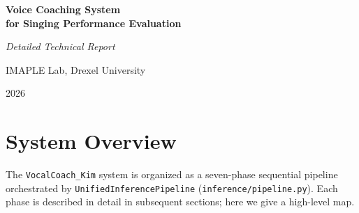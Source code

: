 \documentclass[11pt,letterpaper]{article}
\begin{document}
\begin{titlepage}
  \centering
  \vspace*{2cm}
  {\LARGE\bfseries Voice Coaching System\\[6pt]
   for Singing Performance Evaluation\par}
  \vspace{0.5cm}
  {\large\itshape Detailed Technical Report\par}
  \vspace{1.5cm}
  {\large IMAPLE Lab, Drexel University\par}
  \vspace{0.5cm}
  {\large 2026\par}
  \vspace{2cm}
  \begin{abstract}
    \noindent
    This report provides a comprehensive technical description of the
    \texttt{VocalCoach\_Kim} software system — a reference-guided pipeline for
    objective singing performance evaluation.
    The system accepts a raw audio recording and a musical reference (MusicXML
    score and Praat TextGrid annotation) and produces a structured coaching
    report covering pitch accuracy, timing, note duration, and lyric
    intelligibility.
    Three deep neural networks act as \emph{feature extractors}: a
    torchcrepe/CREPE CNN for fundamental frequency estimation, a fine-tuned
    Wav2Vec2 model with a three-class linear head for note onset/offset
    detection, and a pre-trained Wav2Vec2 CTC model for phoneme boundary
    detection.
    All coaching scores are derived from explicit mathematical equations applied
    to extracted parameters; no model directly predicts a score, making the
    system fully interpretable and deterministic.
    This report describes every pipeline stage in detail, including data
    representations, algorithmic choices, configuration parameters, and the
    mathematical formulae underlying all metrics and scores.
  \end{abstract}
\end{titlepage}

\tableofcontents
\newpage

\section{System Overview}

The \texttt{VocalCoach\_Kim} system is organized as a seven-phase sequential
pipeline orchestrated by \texttt{UnifiedInferencePipeline}
(\texttt{inference/pipeline.py}).
Each phase is described in detail in subsequent sections; here we give a
high-level map.
\end{document}
